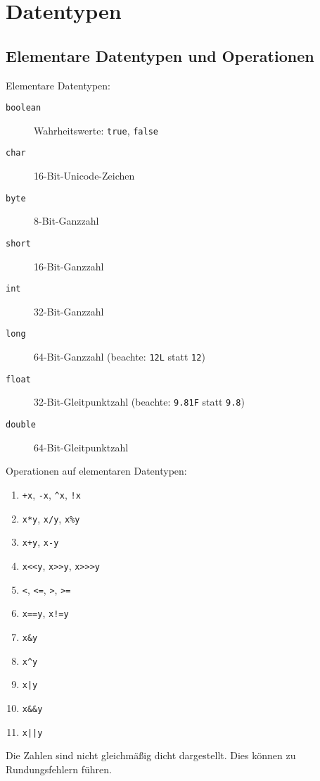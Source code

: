 \chapter{Datentypen}

\section{Elementare Datentypen und Operationen}
\begin{definition}
  Elementare Datentypen:
  \begin{description}
  \item[\texttt{boolean}] Wahrheitswerte: \texttt{true}, \texttt{false}
  \item[\texttt{char}] 16-Bit-Unicode-Zeichen
  \item[\texttt{byte}] 8-Bit-Ganzzahl
  \item[\texttt{short}] 16-Bit-Ganzzahl
  \item[\texttt{int}] 32-Bit-Ganzzahl
  \item[\texttt{long}] 64-Bit-Ganzzahl (beachte: \texttt{12L} statt \texttt{12})
  \item[\texttt{float}] 32-Bit-Gleitpunktzahl (beachte: \texttt{9.81F} statt \texttt{9.8})
  \item[\texttt{double}] 64-Bit-Gleitpunktzahl
  \end{description}
\end{definition}
\begin{definition}
  Operationen auf elementaren Datentypen:
  \begin{enumerate}
  \item \texttt{+x}, \texttt{-x}, \texttt{\^{}x}, \texttt{!x}
  \item \texttt{x*y}, \texttt{x/y}, \texttt{x\%y}
  \item \texttt{x+y}, \texttt{x-y}
  \item \texttt{x<{}<y}, \texttt{x>{}>y}, \texttt{x>{}>{}>y}
  \item \texttt{<}, \texttt{<=}, \texttt{>}, \texttt{>=}
  \item \texttt{x==y}, \texttt{x!=y}
  \item \texttt{x\&y}
  \item \texttt{x\^{}y}
  \item \texttt{x|y}
  \item \texttt{x\&\&y}
  \item \texttt{x||y}
  \end{enumerate}
\end{definition}
\begin{remark}[Gleitkommazahlen]
  Die Zahlen sind nicht gleichmäßig dicht dargestellt. Dies können zu Rundungsfehlern führen.
\end{remark}

